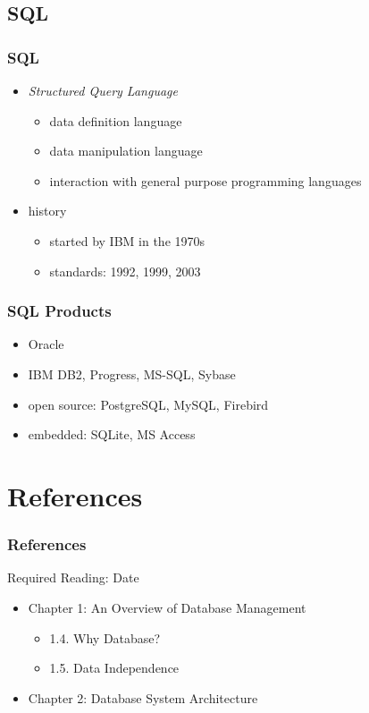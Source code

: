 \documentclass[dvipsnames]{beamer}
\theoremstyle{plain}
\begin{document}
\subsection{SQL}

\begin{frame}
  \frametitle{SQL}

  \begin{itemize}
    \item \emph{Structured Query Language}
    \begin{itemize}
      \item data definition language
      \item data manipulation language
      \item interaction with general purpose programming languages
    \end{itemize}

    \pause
    \bigskip
    \item history
    \begin{itemize}
      \item started by IBM in the 1970s
      \item standards: 1992, 1999, 2003
    \end{itemize}
  \end{itemize}
\end{frame}

\begin{frame}
  \frametitle{SQL Products}

  \begin{itemize}
    \item Oracle
    \item IBM DB2, Progress, MS-SQL, Sybase
    \item open source: PostgreSQL, MySQL, Firebird
    \item embedded: SQLite, MS Access
  \end{itemize}
\end{frame}

\section*{References}

\begin{frame}
  \frametitle{References}

  \begin{block}{Required Reading: Date}
    \begin{itemize}
      \item Chapter 1: An Overview of Database Management
      \begin{itemize}
        \item 1.4. \alert{Why Database?}
        \item 1.5. \alert{Data Independence}
      \end{itemize}

      \item Chapter 2: \alert{Database System Architecture}
    \end{itemize}
  \end{block}
\end{frame}
\end{document}
